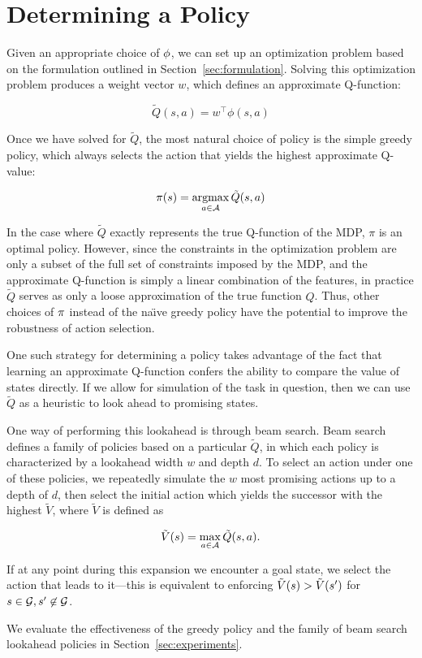 \section{Determining a Policy}

Given an appropriate choice of $\phi{}$, we can set up an optimization
problem based on the formulation outlined in
Section~\ref{sec:formulation}. Solving this optimization problem produces a
weight vector $w$, which defines an approximate Q-function:

\begin{equation}
  \tilde{Q}(s,a) = w^\intercal \phi(s,a)
\end{equation}


Once we have solved for $\tilde{Q}$, the most natural choice of policy is the
simple greedy policy, which always selects the action that yields the highest
approximate Q-value:

\begin{equation}
  \pi(s) = \operatorname*{argmax}_{a \in \mathcal{A}} \tilde{Q}(s,a)
\end{equation}

In the case where $\tilde{Q}$ exactly represents the true Q-function of the MDP,
$\pi$ is an optimal policy. However, since the constraints in the optimization
problem are only a subset of the full set of constraints imposed by the MDP, and
the approximate Q-function is simply a linear combination of the features, in
practice $\tilde{Q}$ serves as only a loose approximation of the true function
$Q$. Thus, other choices of $\pi{}$ instead of the na\"{\i}ve greedy
policy have the potential to improve the robustness of action selection.

One such strategy for determining a policy takes advantage of the fact that
learning an approximate Q-function confers the ability to compare the value of
states directly. If we allow for simulation of the task in question, then we can
use $\tilde{Q}$ as a heuristic to look ahead to promising states.

One way of performing this lookahead is through beam search. Beam search defines
a family of policies based on a particular $\tilde{Q}$, in which each policy is
characterized by a lookahead width $w$ and depth $d$. To select an action under
one of these policies, we repeatedly simulate the $w$ most promising actions up
to a depth of $d$, then select the initial action which yields the successor
with the highest $\tilde{V}$, where $\tilde{V}$ is defined as

\begin{equation}
  \tilde{V}(s) = \max_{a \in \mathcal{A}} \tilde{Q}(s, a).
\end{equation}


If at any point during this expansion we encounter a goal state, we select the
action that leads to it---this is equivalent to enforcing
$\tilde{V}(s{}) > \tilde{V}(s{}')$ for $s{} \in
\mathcal{G}{}, s{}' \not\in \mathcal{G}{}$.

We evaluate the effectiveness of the greedy policy and the family of beam search
lookahead policies in Section~\ref{sec:experiments}.

